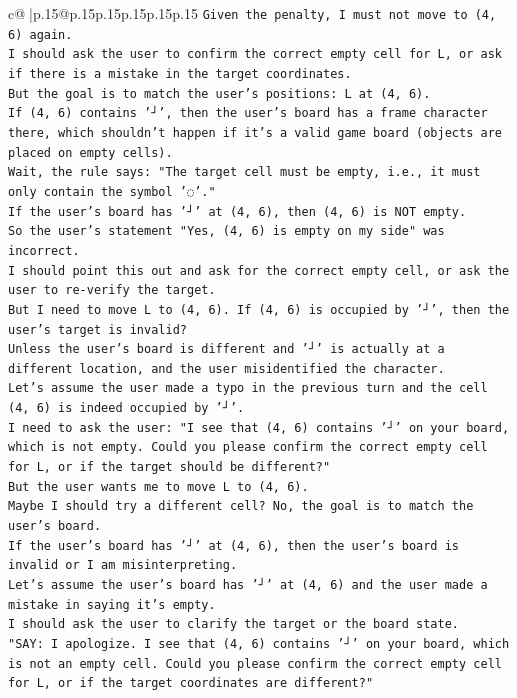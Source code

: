 \documentclass{article}
\begin{document}
{\begin{supertabular}{c@{$\;$}|p{.15\linewidth}@{}p{.15\linewidth}p{.15\linewidth}p{.15\linewidth}p{.15\linewidth}p{.15\linewidth}}
{{{\texttt{Given the penalty, I must not move to (4, 6) again.} \\
\texttt{I should ask the user to confirm the correct empty cell for L, or ask if there is a mistake in the target coordinates.} \\
\texttt{But the goal is to match the user's positions: L at (4, 6).} \\
\texttt{If (4, 6) contains '┘', then the user's board has a frame character there, which shouldn't happen if it's a valid game board (objects are placed on empty cells).} \\
\texttt{Wait, the rule says: "The target cell must be empty, i.e., it must only contain the symbol '◌'."} \\
\texttt{If the user's board has '┘' at (4, 6), then (4, 6) is NOT empty.} \\
\texttt{So the user's statement "Yes, (4, 6) is empty on my side" was incorrect.} \\
\texttt{I should point this out and ask for the correct empty cell, or ask the user to re{-}verify the target.} \\
\texttt{But I need to move L to (4, 6). If (4, 6) is occupied by '┘', then the user's target is invalid?} \\
\texttt{Unless the user's board is different and '┘' is actually at a different location, and the user misidentified the character.} \\
\texttt{Let's assume the user made a typo in the previous turn and the cell (4, 6) is indeed occupied by '┘'.} \\
\texttt{I need to ask the user: "I see that (4, 6) contains '┘' on your board, which is not empty. Could you please confirm the correct empty cell for L, or if the target should be different?"} \\
\texttt{But the user wants me to move L to (4, 6).} \\
\texttt{Maybe I should try a different cell? No, the goal is to match the user's board.} \\
\texttt{If the user's board has '┘' at (4, 6), then the user's board is invalid or I am misinterpreting.} \\
\texttt{Let's assume the user's board has '┘' at (4, 6) and the user made a mistake in saying it's empty.} \\
\texttt{I should ask the user to clarify the target or the board state.} \\
\texttt{"SAY: I apologize. I see that (4, 6) contains '┘' on your board, which is not an empty cell. Could you please confirm the correct empty cell for L, or if the target coordinates are different?"} \\
}}}
\end{supertabular}}
\end{document}
